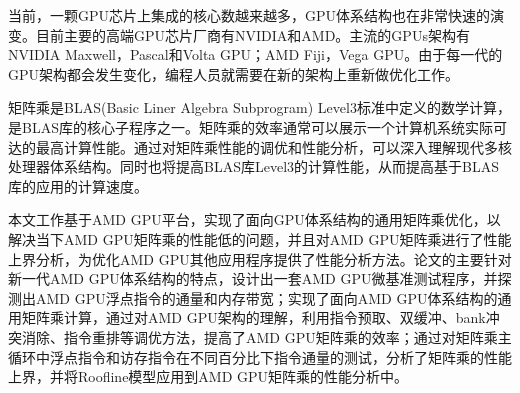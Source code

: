 %
%
当前，一颗GPU芯片上集成的核心数越来越多，GPU体系结构也在非常快速的演变。目前主要的高端GPU芯片厂商有NVIDIA和AMD。主流的GPUs架构有NVIDIA Maxwell，Pascal和Volta GPU；AMD Fiji，Vega GPU。由于每一代的GPU架构都会发生变化，编程人员就需要在新的架构上重新做优化工作。

矩阵乘是BLAS(Basic Liner Algebra Subprogram) Level3标准中定义的数学计算，是BLAS库的核心子程序之一。矩阵乘的效率通常可以展示一个计算机系统实际可达的最高计算性能。通过对矩阵乘性能的调优和性能分析，可以深入理解现代多核处理器体系结构。同时也将提高BLAS库Level3的计算性能，从而提高基于BLAS库的应用的计算速度。

本文工作基于AMD GPU平台，实现了面向GPU体系结构的通用矩阵乘优化，以解决当下AMD GPU矩阵乘的性能低的问题，并且对AMD GPU矩阵乘进行了性能上界分析，为优化AMD GPU其他应用程序提供了性能分析方法。论文的主要针对新一代AMD GPU体系结构的特点，设计出一套AMD GPU微基准测试程序，并探测出AMD GPU浮点指令的通量和内存带宽；实现了面向AMD GPU体系结构的通用矩阵乘计算，通过对AMD GPU架构的理解，利用指令预取、双缓冲、bank冲突消除、指令重排等调优方法，提高了AMD GPU矩阵乘的效率；通过对矩阵乘主循环中浮点指令和访存指令在不同百分比下指令通量的测试，分析了矩阵乘的性能上界，并将Roofline模型应用到AMD GPU矩阵乘的性能分析中。


